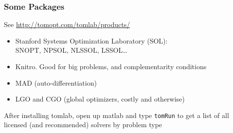 \documentclass[nofootline]{etk-presentation}
\begin{document}
\begin{frame}[fragile]	\frametitle{Some Packages}
	See \url{http://tomopt.com/tomlab/products/}
	\begin{itemize}
		\item Stanford 
		Systems Optimization Laboratory (SOL):\\SNOPT, NPSOL, NLSSOL, LSSOL\ldots
		\item Knitro.  Good for big problems, and complementarity conditions
		\item MAD (auto-differentiation)
		\item LGO and CGO (global optimizers, costly and otherwise)
	\end{itemize}
After installing tomlab, open up matlab and type \verb!tomRun! to get a list of all licensed (and recommended) solvers by problem type
\end{frame}
%
\end{document}
